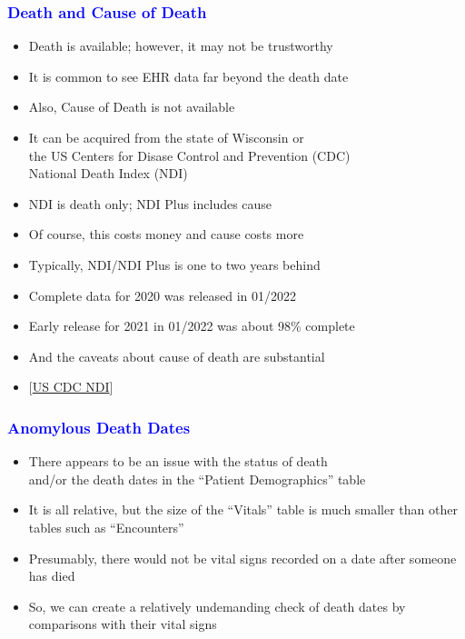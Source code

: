 \documentclass[11pt,pdftex,dvipsnames,usenames]{beamer}
\begin{document}
\begin{frame}[fragile]\frametitle{\bf\textcolor{blue}{Death and Cause
      of Death}}

\begin{itemize}
\item Death is available; however, it may not be trustworthy
\item It is common to see EHR data far beyond the death date
\item Also, Cause of Death is not available
\item It can be acquired from the state of Wisconsin or\\
the US Centers for Disase Control and Prevention (CDC) \\ 
National Death Index (NDI)
\item NDI is death only; NDI Plus includes cause %
\item Of course, this costs money and cause costs more
\item Typically, NDI/NDI Plus is one to two years behind
\item Complete data for 2020 was released in 01/2022
\item Early release for 2021 in 01/2022 was about 98\% complete 
\item And the caveats about cause of death are substantial
\item \textcolor{PineGreen}{[\href{https://www.cdc.gov/nchs/ndi/index.htm}
{US CDC NDI}]}
\end{itemize}

\end{frame}


\begin{frame}[fragile]\frametitle{\bf\textcolor{blue}{Anomylous Death Dates}}
\begin{itemize}
\item There appears to be an issue with the status of death\\
and/or the death dates in the ``Patient Demographics'' table
\item It is all relative, but the size of the ``Vitals'' table is much smaller
than other tables such as ``Encounters''
\item Presumably, there would not be vital signs recorded on a date after someone has died
\item So, we can create a relatively undemanding check of death dates
by comparisons with their vital signs 
\end{itemize}
\end{frame}
\end{document}
